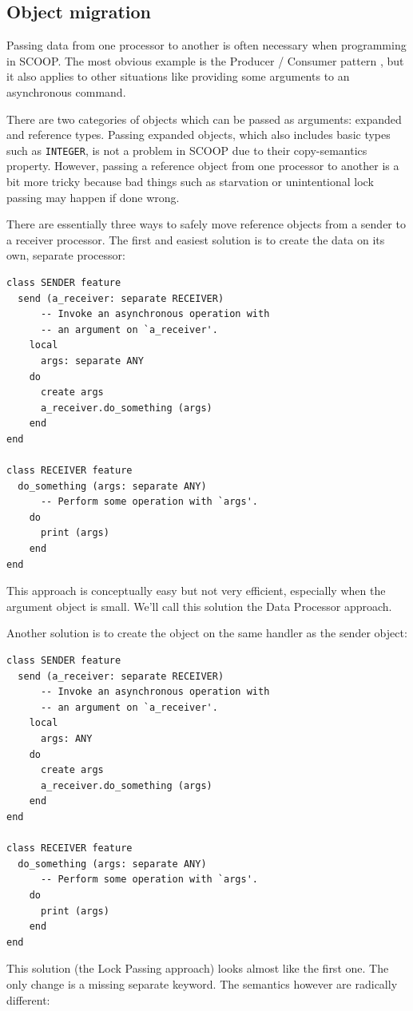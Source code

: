 \documentclass[a4paper,10pt]{article}
\begin{document}
\subsection{Object migration}
\label{sec:object-migration}

Passing data from one processor to another is often necessary when programming in SCOOP.
The most obvious example is the Producer / Consumer pattern , but it also applies to other situations like providing some arguments to an asynchronous command.

There are two categories of objects which can be passed as arguments: expanded and reference types.
Passing expanded objects, which also includes basic types such as \lstinline!INTEGER!, is not a problem in SCOOP due to their copy-semantics property.
However, passing a reference object from one processor to another is a bit more tricky
because bad things such as starvation or unintentional lock passing may happen if done wrong.

There are essentially three ways to safely move reference objects from a sender to a receiver processor.
The first and easiest solution is to create the data on its own, separate processor: 
\begin{lstlisting}[language=OOSC2Eiffel, captionpos=b, caption={Migrate objects on a separate processor.}]
class SENDER feature
  send (a_receiver: separate RECEIVER)
      -- Invoke an asynchronous operation with
      -- an argument on `a_receiver'.
    local
      args: separate ANY
    do
      create args
      a_receiver.do_something (args)
    end
end

class RECEIVER feature 
  do_something (args: separate ANY)
      -- Perform some operation with `args'.
    do
      print (args)
    end
end
\end{lstlisting}
This approach is conceptually easy but not very efficient, especially when the argument object is small.
We'll call this solution the Data Processor approach.

Another solution is to create the object on the same handler as the sender object:
\begin{lstlisting}[language=OOSC2Eiffel, captionpos=b, caption={Migrate objects with lock passing.}]
class SENDER feature
  send (a_receiver: separate RECEIVER)
      -- Invoke an asynchronous operation with
      -- an argument on `a_receiver'.
    local
      args: ANY
    do
      create args
      a_receiver.do_something (args)
    end
end

class RECEIVER feature 
  do_something (args: separate ANY)
      -- Perform some operation with `args'.
    do
      print (args)
    end
end
\end{lstlisting}
This solution (the Lock Passing approach) looks almost like the first one.
The only change is a missing separate keyword.
The semantics however are radically different:
\end{document}
